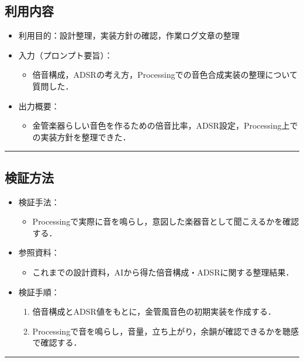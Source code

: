 \documentclass[uplatex,dvipdfmx,a4paper,11pt]{jsarticle}
\newcommand{\sectionrule}{\par\medskip\noindent\rule{\linewidth}{0.6pt}\par\medskip}
\begin{document}
\subsection{利用内容}

\begin{itemize}
  \item 利用目的：設計整理，実装方針の確認，作業ログ文章の整理
  \item 入力（プロンプト要旨）：
    \begin{itemize}
      \item 倍音構成，ADSRの考え方，Processingでの音色合成実装の整理について質問した．
    \end{itemize}
  \item 出力概要：
    \begin{itemize}
      \item 金管楽器らしい音色を作るための倍音比率，ADSR設定，Processing上での実装方針を整理できた．
    \end{itemize}
\end{itemize}

\sectionrule

\subsection{検証方法}


\begin{itemize}
  \item 検証手法：
    \begin{itemize}
      \item Processingで実際に音を鳴らし，意図した楽器音として聞こえるかを確認する．
    \end{itemize}
  \item 参照資料：
    \begin{itemize}
      \item これまでの設計資料，AIから得た倍音構成・ADSRに関する整理結果．
    \end{itemize}
  \item 検証手順：
    \begin{enumerate}
      \item 倍音構成とADSR値をもとに，金管風音色の初期実装を作成する．
      \item Processingで音を鳴らし，音量，立ち上がり，余韻が確認できるかを聴感で確認する．
    \end{enumerate}
\end{itemize}

\sectionrule
\end{document}
